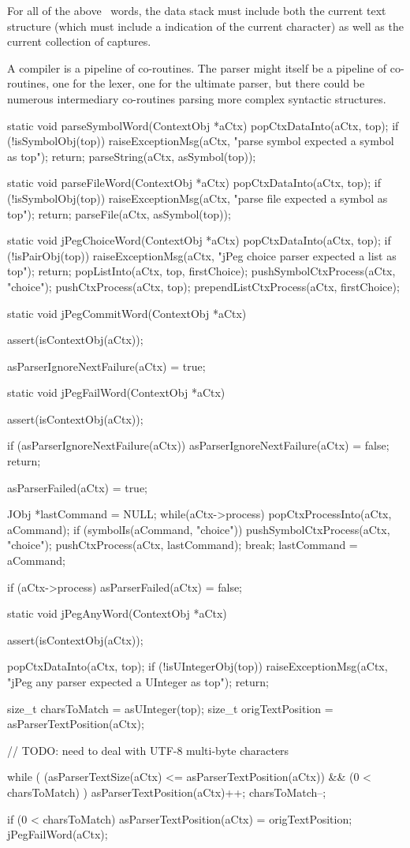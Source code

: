For all of the above \joylol\ words, the data stack must include both the 
current text structure (which must include a indication of the current 
character) as well as the current collection of captures. 

A compiler is a pipeline of co-routines. The parser might itself be a 
pipeline of co-routines, one for the lexer, one for the ultimate parser, 
but there could be numerous intermediary co-routines parsing more complex 
syntactic structures. 

\startCCode
static void parseSymbolWord(ContextObj *aCtx) {
  popCtxDataInto(aCtx, top);
  if (!isSymbolObj(top)) {
    raiseExceptionMsg(aCtx,
      "parse symbol expected a symbol as top");
    return;
  }
  parseString(aCtx, asSymbol(top));
}

static void parseFileWord(ContextObj *aCtx) {
  popCtxDataInto(aCtx, top);
  if (!isSymbolObj(top)) {
    raiseExceptionMsg(aCtx,
      "parse file expected a symbol as top");
    return;
  }
  parseFile(aCtx, asSymbol(top));
}

static void jPegChoiceWord(ContextObj *aCtx) {
  popCtxDataInto(aCtx, top);
  if (!isPairObj(top)) {
    raiseExceptionMsg(aCtx,
      "jPeg choice parser expected a list as top");
    return;
  }
  popListInto(aCtx, top, firstChoice);
  pushSymbolCtxProcess(aCtx, "choice");
  pushCtxProcess(aCtx, top);
  prependListCtxProcess(aCtx, firstChoice);
}

static void jPegCommitWord(ContextObj *aCtx) {
  assert(isContextObj(aCtx));
  
  asParserIgnoreNextFailure(aCtx) = true;
}

static void jPegFailWord(ContextObj *aCtx) {
  assert(isContextObj(aCtx));

  if (asParserIgnoreNextFailure(aCtx)) {
    asParserIgnoreNextFailure(aCtx) = false;
    return;
  }
  
  asParserFailed(aCtx) = true;
  
  JObj *lastCommand = NULL;
  while(aCtx->process) {
    popCtxProcessInto(aCtx, aCommand);
    if (symbolIs(aCommand, "choice")) {
      pushSymbolCtxProcess(aCtx, "choice");
      pushCtxProcess(aCtx, lastCommand);
      break;
    }
    lastCommand = aCommand;
  }
  
  if (aCtx->process) {
    asParserFailed(aCtx) = false;
  }
}

static void jPegAnyWord(ContextObj *aCtx) {
  assert(isContextObj(aCtx));
  
  popCtxDataInto(aCtx, top);
  if (!isUIntegerObj(top)) {
    raiseExceptionMsg(aCtx,
      "jPeg any parser expected a UInteger as top");
    return;
  }
  
  size_t charsToMatch     = asUInteger(top);
  size_t origTextPosition = asParserTextPosition(aCtx);
  
  // TODO: need to deal with UTF-8 multi-byte characters
  
  while (
    (asParserTextSize(aCtx) <= asParserTextPosition(aCtx)) &&
    (0 < charsToMatch)
  ) {
    asParserTextPosition(aCtx)++;
    charsToMatch--;
  }
  
  if (0 < charsToMatch) {
    asParserTextPosition(aCtx) = origTextPosition;
    jPegFailWord(aCtx);
  }

}

